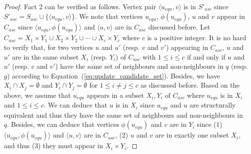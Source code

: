 \begin{proof}
    Fact 2 can be verified as follows. Vertex pair $\langle u_{equ},v \rangle$ is in $S'_{asc}$ since $S'_{asc}=S_{asc}\cup \{\langle u_{equ},v\rangle\}$. We note that vertices $u_{equ}$, $\phi(u_{equ})$, $u$ and $v$ appear in $C_{asc}$ since $\langle u_{equ},\phi(u_{equ})\rangle$ and $\langle u,v\rangle$ are in $C_{asc}$ discussed before. Let $C_{asc}=X_1\times Y_1 \cup  X_2\times Y_2\cup \cdots \cup  X_c\times Y_c$ where $c$ is a positive integer. 
    It is no hard to verify that, for two vertices $u$ and $u'$ (resp. $v$ and $v'$) appearing in $C_{asc}$, $u$ and $u'$ are in the same subset $X_i$ (resp. $Y_i$) of $C_{asc}$ with $1\leq i\leq c$ if and only if $u$ and $u'$ (resp. $v$ and $v'$) have the same set of neighbours and non-neighbours in $q$ (resp. $g$) according to Equation~(\ref{eq:update_candidate_set}).
    Besides, we have $X_i\cap X_j=\emptyset$ and $Y_i\cap Y_j=\emptyset$ for $1\leq i\neq j \leq c$ as discussed before. %
    Based on the above, we assume that $u_{equ}$ appears in a subset $X_i,Y_i$ of $C_{asc}$ where $u_{equ}$ is in $X_i$ and $1\leq i\leq c$. We can deduce that $u$ is in $X_i$ since $u_{equ}$ and $u$ are structurally equivalent and thus they have the same set of neighbours and non-neighbours in $q$. Besides, we can deduce that vertices $\phi(u_{equ})$ and $v$ are in $Y_i$ since (1) $\langle u_{equ},\phi(u_{equ})\rangle$ and $\langle u,v\rangle$ are in $C_{asc}$, (2) $u$ and $v$ are in exactly one subset $X_i$, and thus (3) they must appear in $X_i\times Y_i$.   
\end{proof}

